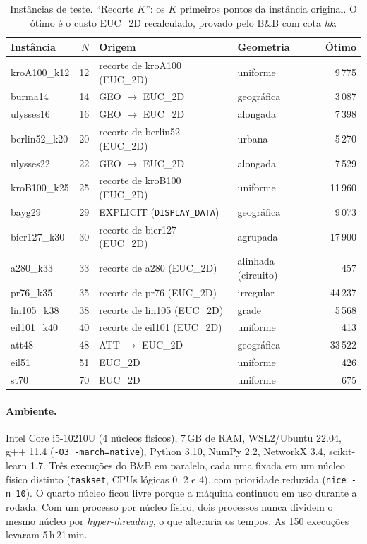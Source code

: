 \documentclass[12pt]{article}
\begin{document}
\begin{table}[ht]
\centering
\caption{Instâncias de teste. ``Recorte $K$'': os $K$ primeiros pontos da instância
original. O ótimo é o custo EUC\_2D recalculado, provado pelo B\&B com cota \textit{hk}.}
\label{tab:instancias}
\small
\begin{tabular}{lrllr}
\toprule
Instância & $N$ & Origem & Geometria & Ótimo \\
\midrule
kroA100\_k12 & 12 & recorte de kroA100 (EUC\_2D) & uniforme & 9\,775 \\
burma14 & 14 & GEO $\to$ EUC\_2D & geográfica & 3\,087 \\
ulysses16 & 16 & GEO $\to$ EUC\_2D & alongada & 7\,398 \\
berlin52\_k20 & 20 & recorte de berlin52 (EUC\_2D) & urbana & 5\,270 \\
ulysses22 & 22 & GEO $\to$ EUC\_2D & alongada & 7\,529 \\
kroB100\_k25 & 25 & recorte de kroB100 (EUC\_2D) & uniforme & 11\,960 \\
bayg29 & 29 & EXPLICIT (\texttt{DISPLAY\_DATA}) & geográfica & 9\,073 \\
bier127\_k30 & 30 & recorte de bier127 (EUC\_2D) & agrupada & 17\,900 \\
a280\_k33 & 33 & recorte de a280 (EUC\_2D) & alinhada (circuito) & 457 \\
pr76\_k35 & 35 & recorte de pr76 (EUC\_2D) & irregular & 44\,237 \\
lin105\_k38 & 38 & recorte de lin105 (EUC\_2D) & grade & 5\,568 \\
eil101\_k40 & 40 & recorte de eil101 (EUC\_2D) & uniforme & 413 \\
att48 & 48 & ATT $\to$ EUC\_2D & geográfica & 33\,522 \\
eil51 & 51 & EUC\_2D & uniforme & 426 \\
st70 & 70 & EUC\_2D & uniforme & 675 \\
\bottomrule
\end{tabular}
\end{table}

\paragraph{Ambiente.} Intel Core i5-10210U (4 núcleos físicos), 7\,GB de RAM, WSL2/Ubuntu
22.04, g++ 11.4 (\texttt{-O3 -march=native}), Python 3.10, NumPy 2.2, NetworkX 3.4,
scikit-learn 1.7. Três execuções do B\&B em paralelo, cada uma fixada em um núcleo físico
distinto (\texttt{taskset}, CPUs lógicas 0, 2 e 4), com prioridade reduzida
(\texttt{nice -n 10}). O quarto núcleo ficou livre porque a máquina continuou em uso
durante a rodada. Com um processo por núcleo físico, dois processos nunca dividem o
mesmo núcleo por \textit{hyper-threading}, o que alteraria os tempos. As 150 execuções
levaram 5\,h\,21\,min.
\end{document}
